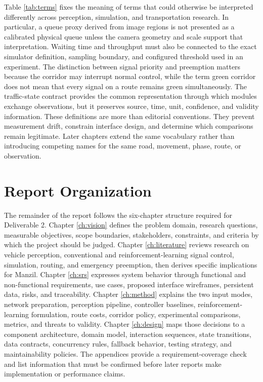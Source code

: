 Table \ref{tab:terms} fixes the meaning of terms that could otherwise be interpreted differently across perception, simulation, and transportation research. In particular, a queue proxy derived from image regions is not presented as a calibrated physical queue unless the camera geometry and scale support that interpretation. Waiting time and throughput must also be connected to the exact simulator definition, sampling boundary, and configured threshold used in an experiment. The distinction between signal priority and preemption matters because the corridor may interrupt normal control, while the term green corridor does not mean that every signal on a route remains green simultaneously. The traffic-state contract provides the common representation through which modules exchange observations, but it preserves source, time, unit, confidence, and validity information. These definitions are more than editorial conventions. They prevent measurement drift, constrain interface design, and determine which comparisons remain legitimate. Later chapters extend the same vocabulary rather than introducing competing names for the same road, movement, phase, route, or observation.

\section{Report Organization}

The remainder of the report follows the six-chapter structure required for Deliverable 2. Chapter \ref{ch:vision} defines the problem domain, research questions, measurable objectives, scope boundaries, stakeholders, constraints, and criteria by which the project should be judged. Chapter \ref{ch:literature} reviews research on vehicle perception, conventional and reinforcement-learning signal control, simulation, routing, and emergency preemption, then derives specific implications for Manzil. Chapter \ref{ch:srs} expresses system behavior through functional and non-functional requirements, use cases, proposed interface wireframes, persistent data, risks, and traceability. Chapter \ref{ch:method} explains the two input modes, network preparation, perception pipeline, controller baselines, reinforcement-learning formulation, route costs, corridor policy, experimental comparisons, metrics, and threats to validity. Chapter \ref{ch:design} maps those decisions to a component architecture, domain model, interaction sequences, state transitions, data contracts, concurrency rules, fallback behavior, testing strategy, and maintainability policies. The appendices provide a requirement-coverage check and list information that must be confirmed before later reports make implementation or performance claims.


